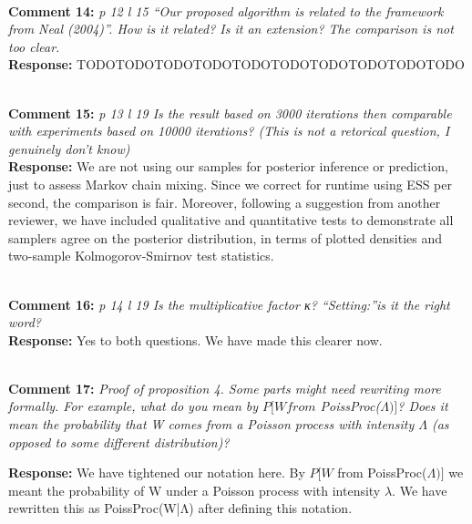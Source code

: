 \documentclass[11pt]{article}
\newcommand{\rev}[2]{\textbf{Comment #1: }\emph{#2}}
\newcommand{\resp}{\textbf{Response: }}
\begin{document}
~\\
\rev{14}{p 12 l 15 “Our proposed algorithm is related to the framework from Neal (2004)”. How is it related? Is it an extension? The comparison is not too clear.}\\
\resp TODOTODOTODOTODOTODOTODOTODOTODOTODOTODO

~\\
\rev{15}{p 13 l 19 Is the result based on 3000 iterations then comparable with experiments based on 10000 iterations? (This is not a retorical question, I genuinely don’t know) }\\
\resp We are not using our samples for posterior inference or prediction, just to assess Markov chain mixing. Since we correct for runtime using ESS per second, the comparison is fair. Moreover, following a suggestion from another reviewer, we have included qualitative and quantitative tests to demonstrate all samplers agree on the posterior distribution, in terms of plotted densities and two-sample Kolmogorov-Smirnov test statistics.

~\\
\rev{16}{p 14 l 19 Is the multiplicative factor κ?   
“Setting:”is it the right word?} \\
\resp Yes to both questions. We have made this clearer now. 

~\\
\rev{17}{Proof of proposition 4. Some parts might need rewriting more formally. For example, what do you mean by $P[W from$ PoissProc($\Lambda)]$? Does it mean the probability that W comes from a Poisson process with intensity $\Lambda$ (as opposed to some different distribution)?}

\noindent \resp We have tightened our notation here. By $P[W$ from PoissProc($\Lambda)]$ we meant the probability of W under a Poisson process with intensity $\lambda$. We have rewritten this as PoissProc(W|Λ) after defining this notation.
\end{document}
